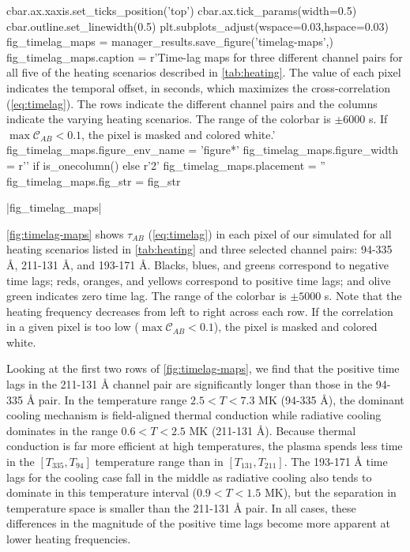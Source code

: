 \begin{pycode}
            cbar.ax.xaxis.set_ticks_position('top')
            cbar.ax.tick_params(width=0.5)
            cbar.outline.set_linewidth(0.5)
plt.subplots_adjust(wspace=0.03,hspace=0.03)
fig_timelag_maps = manager_results.save_figure('timelag-maps',)
fig_timelag_maps.caption = r'Time-lag maps for three different channel pairs for all five of the heating scenarios described in \autoref{tab:heating}. The value of each pixel indicates the temporal offset, in seconds, which maximizes the cross-correlation (\autoref{eq:timelag}). The rows indicate the different channel pairs and the columns indicate the varying heating scenarios. The range of the colorbar is $\pm6000$ s. If $\max{\mathcal{C}_{AB}}<0.1$, the pixel is masked and colored white.'
fig_timelag_maps.figure_env_name = 'figure*'
fig_timelag_maps.figure_width = r'\columnwidth' if is_onecolumn() else r'2\columnwidth'
fig_timelag_maps.placement = ''
fig_timelag_maps.fig_str = fig_str
\end{pycode}
|fig_timelag_maps|

\autoref{fig:timelag-maps} shows $\tau_{AB}$ (\autoref{eq:timelag}) in each pixel of our simulated \AR{} for all heating scenarios listed in \autoref{tab:heating} and three selected channel pairs: 94-335 \AA{}, 211-131 \AA{}, and 193-171 \AA{}. Blacks, blues, and greens correspond to negative time lags; reds, oranges, and yellows correspond to positive time lags; and olive green indicates zero time lag. The range of the colorbar is $\pm5000$ s. Note that the heating frequency decreases from left to right across each row. If the correlation in a given pixel is too low ($\max{\mathcal{C}_{AB}}<0.1$), the pixel is masked and colored white.

Looking at the first two rows of \autoref{fig:timelag-maps}, we find that the positive time lags in the 211-131 \AA{} channel pair are significantly longer than those in the 94-335 \AA{} pair. In the temperature range $2.5<T<7.3$ MK (94-335 \AA{}), the dominant cooling mechanism is field-aligned thermal conduction while radiative cooling dominates in the range $0.6<T<2.5$ MK (211-131 \AA{}). Because thermal conduction is far more efficient at high temperatures, the plasma spends less time in the $[T_{335},T_{94}]$ temperature range than in $[T_{131},T_{211}]$. The 193-171 \AA{} time lags for the cooling case fall in the middle as radiative cooling also tends to dominate in this temperature interval ($0.9<T<1.5$ MK), but the separation in temperature space is smaller than the 211-131 \AA{} pair. In all cases, these differences in the magnitude of the positive time lags become more apparent at lower heating frequencies.

